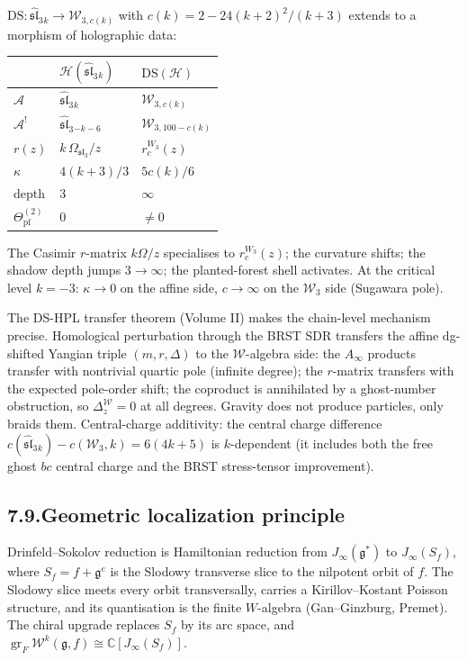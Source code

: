 \documentclass[11pt,reqno]{amsart}
\theoremstyle{definition}
\theoremstyle{remark}
\providecommand{\cA}{\mathcal{A}}
\providecommand{\cH}{\mathcal{H}}
\providecommand{\cW}{\mathcal{W}}
\providecommand{\fg}{\mathfrak{g}}
\providecommand{\bC}{\mathbb{C}}
\providecommand{\fsl}{\mathfrak{sl}}
\DeclareMathOperator{\gr}{gr}
\numberwithin{equation}{section}
\begin{document}
$\mathrm{DS}\colon \widehat{\mathfrak{sl}}_3{}_k \to \cW_{3,c(k)}$
with $c(k) = 2 - 24(k+2)^2/(k+3)$ extends to a morphism of
holographic data:
\begin{center}
\renewcommand{\arraystretch}{1.15}
\begin{tabular}{lll}
& $\cH(\widehat{\mathfrak{sl}}_3{}_k)$
 & $\mathrm{DS}(\cH)$\\
\hline
$\cA$ & $\widehat{\mathfrak{sl}}_3{}_k$ & $\cW_{3,c(k)}$\\
$\cA^!$ & $\widehat{\mathfrak{sl}}_3{}_{-k-6}$ & $\cW_{3,100-c(k)}$\\
$r(z)$ & $k\,\Omega_{\mathfrak{sl}_3}/z$ & $r_c^{W_3}(z)$\\
$\kappa$ & $4(k+3)/3$ & $5c(k)/6$\\
depth & $3$ & $\infty$\\
$\Theta^{(2)}_{\mathrm{pf}}$ & $0$ & $\neq 0$
\end{tabular}
\end{center}
The Casimir $r$-matrix $k\Omega/z$ specialises to
$r_c^{W_3}(z)$; the curvature shifts; the shadow depth jumps
$3 \to \infty$; the planted-forest shell activates. At the
critical level $k = -3$: $\kappa \to 0$ on the affine side,
$c \to \infty$ on the $\cW_3$ side (Sugawara pole).

The DS-HPL transfer theorem (Volume II) makes the chain-level
mechanism precise. Homological perturbation through the BRST
SDR transfers the affine dg-shifted Yangian triple
$(m, r, \Delta)$ to the $\cW$-algebra side: the $A_\infty$
products transfer with nontrivial quartic pole (infinite
degree); the $r$-matrix transfers with the expected pole-order
shift; the coproduct is annihilated by a ghost-number
obstruction, so $\Delta_z^\cW = 0$ at all degrees. Gravity
does not produce particles, only braids them. Central-charge
additivity: the central charge difference
$c(\widehat{\fsl}_3{}_k) - c(\cW_3, k) = 6(4k{+}5)$
is $k$-dependent (it includes both the free ghost $bc$ central charge
and the BRST stress-tensor improvement).

\subsection*{7.9.\quad Geometric localization principle}

Drinfeld--Sokolov reduction is Hamiltonian reduction from
$J_\infty(\fg^*)$ to $J_\infty(S_f)$, where $S_f = f + \fg^e$
is the Slodowy transverse slice to the nilpotent orbit of $f$.
The Slodowy slice meets every orbit transversally, carries a
Kirillov--Kostant Poisson structure, and its quantisation is
the finite $W$-algebra (Gan--Ginzburg, Premet). The chiral
upgrade replaces $S_f$ by its arc space, and
$\gr_F \cW^k(\fg, f) \cong \bC[J_\infty(S_f)]$.
\end{document}
